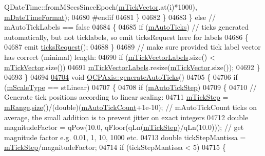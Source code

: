 \begin{DoxyCode}
      QDateTime::fromMSecsSinceEpoch(\hyperlink{a00025_aae0f9b9973b85be601200f00f5825087}{mTickVector}.at(i)*1000), \hyperlink{a00025_a0b7ad83550d71daab4cfee2918e168e0}{mDateTimeFormat});
04680 \textcolor{preprocessor}{#endif}
04681       \}
04682     \}
04683   \} \textcolor{keywordflow}{else} \textcolor{comment}{// mAutoTickLabels == false}
04684   \{
04685     \textcolor{keywordflow}{if} (\hyperlink{a00025_aac23adcbae246bf165d4539ad65ac9f9}{mAutoTicks}) \textcolor{comment}{// ticks generated automatically, but not ticklabels, so emit ticksRequest
       here for labels}
04686     \{
04687       emit \hyperlink{a00025_af46d99613d29518795134ec4928e3873}{ticksRequest}();
04688     \}
04689     \textcolor{comment}{// make sure provided tick label vector has correct (minimal) length:}
04690     \textcolor{keywordflow}{if} (\hyperlink{a00025_aeee4bd0fca3f587eafe33843d1cb4f82}{mTickVectorLabels}.size() < \hyperlink{a00025_aae0f9b9973b85be601200f00f5825087}{mTickVector}.size())
04691       \hyperlink{a00025_aeee4bd0fca3f587eafe33843d1cb4f82}{mTickVectorLabels}.resize(\hyperlink{a00025_aae0f9b9973b85be601200f00f5825087}{mTickVector}.size());
04692   \}
04693 \}
04694 
\hypertarget{a00115_source_l04704}{}\hyperlink{a00025_a626eef437c874148df1a5ac78506d463}{04704} \textcolor{keywordtype}{void} \hyperlink{a00025_a626eef437c874148df1a5ac78506d463}{QCPAxis::generateAutoTicks}()
04705 \{
04706   \textcolor{keywordflow}{if} (\hyperlink{a00025_ad706039549cbbbec5fcb2baf7894e04d}{mScaleType} == stLinear)
04707   \{
04708     \textcolor{keywordflow}{if} (\hyperlink{a00025_aada8934a5c44978653031782aa37d101}{mAutoTickStep})
04709     \{
04710       \textcolor{comment}{// Generate tick positions according to linear scaling:}
04711       \hyperlink{a00025_a4fe96830fc5a2711e20fe5edccfe2ed3}{mTickStep} = \hyperlink{a00025_a1ee36773c49062d751560e11f90845f7}{mRange}.\hyperlink{a00049_afa57c13049b965edb6fd1c00ac56338a}{size}()/(double)(\hyperlink{a00025_a499fbb67111e4b204738f6c1aa28d842}{mAutoTickCount}+1e-10); \textcolor{comment}{//
       mAutoTickCount ticks on average, the small addition is to prevent jitter on exact integers}
04712       \textcolor{keywordtype}{double} magnitudeFactor = qPow(10.0, qFloor(qLn(\hyperlink{a00025_a4fe96830fc5a2711e20fe5edccfe2ed3}{mTickStep})/qLn(10.0))); \textcolor{comment}{// get magnitude
       factor e.g. 0.01, 1, 10, 1000 etc.}
04713       \textcolor{keywordtype}{double} tickStepMantissa = \hyperlink{a00025_a4fe96830fc5a2711e20fe5edccfe2ed3}{mTickStep}/magnitudeFactor;
04714       \textcolor{keywordflow}{if} (tickStepMantissa < 5)
04715       \{

\end{DoxyCode}
